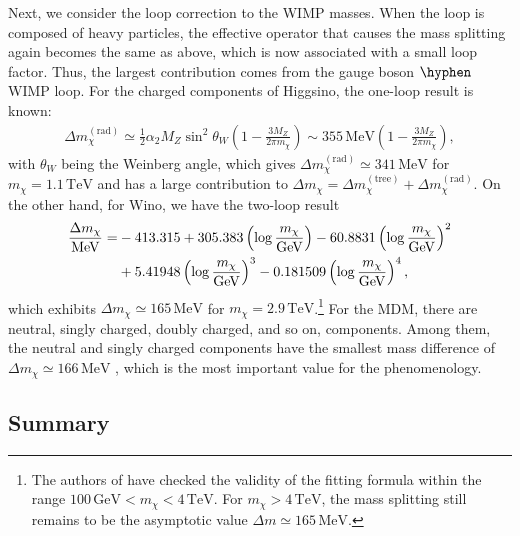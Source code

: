 \documentclass[12pt,twoside,book]{article}
\begin{document}
Next, we consider the loop correction to the WIMP masses.
When the loop is composed of heavy particles, the effective operator that causes the mass splitting again becomes the same as above, which is now associated with a small loop factor.
Thus, the largest contribution comes from the gauge boson $\hyphen$ WIMP loop.
For the charged components of Higgsino, the one-loop result is known: \cite{Fukuda:2017jmk}
\begin{align}
  \Delta m_\chi^{\mathrm{(rad)}} \simeq \frac{1}{2} \alpha_2 M_Z \sin^2 \theta_W
  \left( 1 - \frac{3 M_Z}{2\pi m_\chi} \right)
  \sim 355\,\mathrm{MeV} \left( 1 - \frac{3 M_Z}{2\pi m_\chi} \right),
  \label{eq:Higgsino_delm_rad}
\end{align}
with $\theta_W$ being the Weinberg angle, which gives $\Delta m_\chi^{\mathrm{(rad)}} \simeq 341\,\mathrm{MeV}$ for $m_\chi = 1.1\,\mathrm{TeV}$ and has a large contribution to $\Delta m_\chi = \Delta m_\chi^{\mathrm{(tree)}} + \Delta m_\chi^{\mathrm{(rad)}}$.
On the other hand, for Wino, we have the two-loop result \cite{Ibe:2012sx}
\newcommand{\logmchi}{\left( \log \frac{m_\chi}{\mathrm{GeV}} \right)}
\begin{align}
  \frac{\Delta m_\chi}{\mathrm{MeV}} =
  &-413.315 + 305.383 \logmchi - 60.8831 \logmchi^2 \notag \\
  &+ 5.41948 \logmchi^3 - 0.181509 \logmchi^4,
\end{align}
which exhibits $\Delta m_\chi \simeq 165\,\mathrm{MeV}$ for $m_\chi = 2.9\,\mathrm{TeV}$.\footnote{
  The authors of \cite{Ibe:2012sx} have checked the validity of the fitting formula within the range $100\, \mathrm{GeV} < m_\chi < 4\,\mathrm{TeV}$.
  For $m_\chi > 4\,\mathrm{TeV}$, the mass splitting still remains to be the asymptotic value $\Delta m \simeq 165\,\mathrm{MeV}$.
}
For the MDM, there are neutral, singly charged, doubly charged, and so on, components.
Among them, the neutral and singly charged components have the smallest mass difference of $\Delta m_\chi \simeq 166\, \mathrm{MeV}$ \cite{Cirelli:2005uq}, which is the most important value for the phenomenology.


\subsection{Summary}
\label{sec:model_summary}
\end{document}
